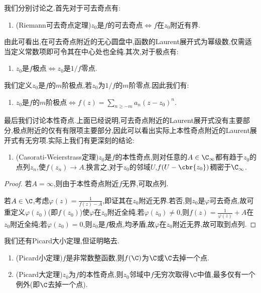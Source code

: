 \documentclass{article}
\begin{document}
我们分别讨论之.首先对于可去奇点有:
\begin{enumerate}[resume]
    \item (Riemann可去奇点定理)$z_0$是$f$的可去奇点$\iff f$在$z_0$附近有界.\\
\end{enumerate}
由此可看出,在可去奇点附近的无心圆盘中,函数的Laurent展开式为幂级数,仅需适当定义常数项即可令其在中心处也全纯.其次,对于极点有:
\begin{enumerate}[resume]
    \item $z_0$是$f$极点$\iff z_0$是$1/f$零点.
\end{enumerate}

我们定义$z_0$是$f$的$m$阶极点,若$z_0$为$1/f$的$m$阶零点.因此我们有:
\begin{enumerate}[resume]
    \item $z_0$是$f$的$m$阶极点$\iff f(z)=\sum_{n\geq -m}a_n(z-z_0)^n$.\\
\end{enumerate}

最后我们讨论本性奇点.上面已经说明,可去奇点附近的Laurent展开式没有主要部分,极点附近的仅有有限项主要部分,因此可以看出实际上本性奇点附近的Laurent展开式有无穷项.实际上我们有更深刻的结论:
\begin{enumerate}[resume]
    \item (Casorati-Weierstrass定理)$z_0$是$f$的本性奇点,则对任意的$A\in \C_\infty$都有趋于$z_0$的点列$z_n$,使$f(z_n)\to A$.换言之,对于$z_0$的邻域$U$,$f(U-\cbr{z_0})$稠密于$\C_\infty$.
\end{enumerate}
\begin{proof}
    若$A=\infty$,则由于本性奇点附近$f$无界,可取点列.

    若$A\in\C$,考虑$\varphi(z)=\frac{1}{f(z)-A}$,即证其在$z_0$附近无界.若否,则$z_0$是$\varphi$可去奇点,故可重定义$\varphi(z_0)$(即$f(z_0)$)使$\varphi$在$z_0$附近全纯.若$\varphi(z_0)\neq 0$,则$f(z)=\frac{1}{\varphi(z)}+A$在$z_0$附近全纯;若$\varphi(z_0)=0$,则$z_0$是$f$极点,均矛盾,故$\varphi$在$z_0$附近无界,故可取到点列.
\end{proof}

我们还有Picard大小定理,但证明略去.
\begin{enumerate}[resume]
    \item (Picard小定理)$f$是非常数整函数,则$f(\C)$为$\C$或$\C$去掉一个点.
    \item (Picard大定理)$z_0$为$f$的本性奇点,则$z_0$邻域中$f$无穷次取得$\C$中值,最多仅有一个例外(即$\C$去掉一个点).
\end{enumerate}
\end{document}
